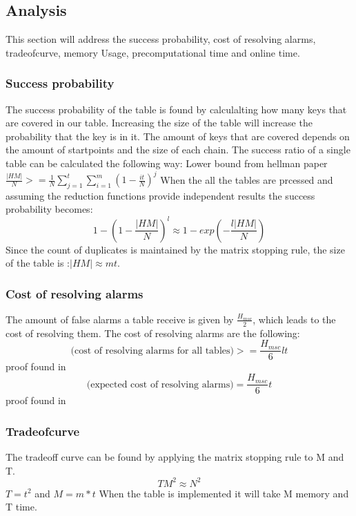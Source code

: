 \subsection*{Analysis}
This section will address the success probability, cost of resolving alarms, tradeofcurve, memory Usage, precomputational time and online time.


\subsubsection*{Success probability}
The success probability of the table is found by calculalting how many keys that are covered in our table. Increasing the size of the table will increase the probability that the key is in it. The amount of keys that are covered depends on the amount of startpoints and the size of each chain. The success ratio of a single table can be calculated the following way:
Lower bound from hellman paper
$\frac{|HM|}{N}>=\frac{1}{N}\sum^{t}_{j=1}\sum^{m}_{i=1}(1-\frac{it}{N})^{j} $
When the all the tables are prcessed and assuming the reduction functions provide independent results the success probability becomes:
\[1-(1-\frac{|HM|}{N})^l\approx 1- exp(-\frac{l|HM|}{N})\]
Since the count of duplicates is maintained by the matrix stopping rule, the size of the table is :$|HM|\approx mt$.
\subsubsection{Cost of resolving alarms}
The amount of false alarms a table receive is given by $\frac{H_{msc}}{2}$\cite{14 in 176}, which leads to the cost of resolving them. The cost of resolving alarms are the following:
\begin{equation}
\text{(cost of resolving alarms for all tables)}>=\frac{H_{msc}}{6}lt
\end{equation}
proof found in \cite{18 in 176}
\begin{equation}
\text{(expected cost of resolving alarms)}=\frac{H_{msc}}{6}t
\end{equation}
proof found in \cite{15 in 176}
\subsubsection{Tradeofcurve}
The tradeoff curve can be found by applying the matrix stopping rule to M and T.
\begin{equation}
TM^2\approx N^2
\end{equation}
$T=t^2$ and $M=m*t$ When the table is implemented it will take M memory and T time.

